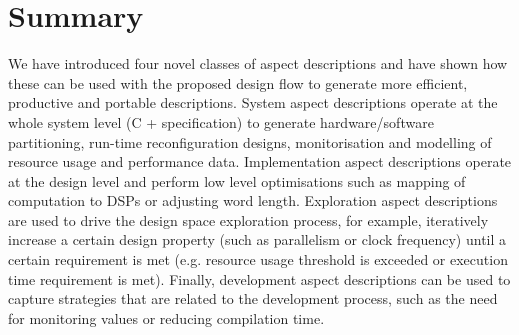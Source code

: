 \section{Summary}

We have introduced four novel classes of aspect descriptions and have
shown how these can be used with the proposed design flow to generate
more efficient, productive and portable descriptions. System aspect
descriptions operate at the whole system level (C + \FAST{}
specification) to generate hardware/software partitioning, run-time
reconfiguration designs, monitorisation and modelling of resource
usage and performance data.  Implementation aspect descriptions
operate at the design level and perform low level optimisations such
as mapping of computation to DSPs or adjusting word
length. Exploration aspect descriptions are used to drive the design
space exploration process, for example, iteratively increase a certain
design property (such as parallelism or clock frequency) until a
certain requirement is met (e.g. resource usage threshold is exceeded
or execution time requirement is met). Finally, development aspect
descriptions can be used to capture strategies that are related to the
development process, such as the need for monitoring values or
reducing compilation time.

